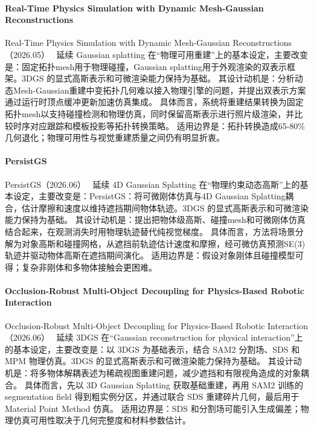 \paragraph{Real-Time Physics Simulation with Dynamic Mesh-Gaussian Reconstructions}
Real-Time Physics Simulation with Dynamic Mesh-Gaussian Reconstructions（2026.05）~\cite{2606_00444} 延续 Gaussian splatting 在“物理可用重建”上的基本设定，主要改变是：固定拓扑mesh用于物理碰撞，Gaussian splatting用于外观渲染的双表示框架。3DGS 的显式高斯表示和可微渲染能力保持为基础。
其设计动机是：分析动态Mesh-Gaussian重建中变拓扑几何难以接入物理引擎的问题，并提出双表示方案通过运行时顶点缓冲更新加速仿真集成。
具体而言，系统将重建结果转换为固定拓扑mesh以支持碰撞检测和物理仿真，同时保留高斯表示进行照片级渲染，并比较时序对应跟踪和模板投影等拓扑转换策略。
适用边界是：拓扑转换造成65-80\%几何退化；物理可用性与视觉重建质量之间仍有明显折衷。

\paragraph{PersistGS}
PersistGS（2026.06）~\cite{2606_03479} 延续 4D Gaussian Splatting 在“物理约束动态高斯”上的基本设定，主要改变是：PersistGS：将可微刚体仿真与4D Gaussian Splatting耦合，估计摩擦和速度以维持遮挡期间物体轨迹。3DGS 的显式高斯表示和可微渲染能力保持为基础。
其设计动机是：提出把物体级高斯、碰撞mesh和可微刚体仿真结合起来，在观测消失时用物理轨迹替代纯视觉梯度。
具体而言，方法将场景分解为对象高斯和碰撞网格，从遮挡前轨迹估计速度和摩擦，经可微仿真预测SE(3)轨迹并驱动物体高斯在遮挡期间演化。
适用边界是：假设对象刚体且碰撞模型可得；复杂非刚体和多物体接触会更困难。

\paragraph{Occlusion-Robust Multi-Object Decoupling for Physics-Based Robotic Interaction}
Occlusion-Robust Multi-Object Decoupling for Physics-Based Robotic Interaction（2026.06）~\cite{2606_29303} 延续 3DGS 在“Gaussian reconstruction for physical interaction”上的基本设定，主要改变是：以 3DGS 为基础表示，结合 SAM2 分割场、SDS 和 MPM 物理仿真。3DGS 的显式高斯表示和可微渲染能力保持为基础。
其设计动机是：将多物体解耦表述为稀疏视图重建问题，减少遮挡和有限视角造成的对象耦合。
具体而言，先以 3D Gaussian Splatting 获取基础重建，再用 SAM2 训练的 segmentation field 得到粗实例分区，并通过联合 SDS 重建碎片几何，最后用于 Material Point Method 仿真。
适用边界是：SDS 和分割场可能引入生成偏差；物理仿真可用性取决于几何完整度和材料参数估计。

